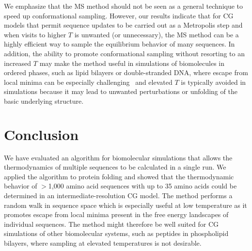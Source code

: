 \documentclass[
aip,
rsi,%
amsmath,amssymb,
reprint,%
]{revtex4-1}
\begin{document}
We emphasize that the MS method should not be seen as a general technique to speed up conformational sampling. However, our results indicate that for CG models that permit sequence updates to be carried out as a Metropolis step and when visits to higher $T$ is unwanted (or unnecessary), the MS method can be a highly efficient way to sample the equilibrium behavior of many sequences. In addition, the ability to promote conformational sampling without resorting to an increased $T$ may make the method useful in simulations of biomolecules in ordered phases, such as lipid bilayers or double-stranded DNA, where escape from local minima can be especially challenging~\cite{Bereau2015,Curuksu2009} and elevated $T$ is typically avoided in simulations because it may lead to unwanted perturbations or unfolding of the basic underlying structure.

\section{Conclusion}
\noindent
We have evaluated an algorithm for biomolecular simulations that allows the thermodynamics of multiple  sequences to be calculated in a single run. We applied the algorithm to protein folding and showed that the thermodynamic behavior of $>$1,000 amino acid sequences with up to 35 amino acids could be determined in an intermediate-resolution CG model. The method performs a random walk in sequence space which is especially useful at low temperature as it promotes escape from local minima present in the free energy landscapes of individual sequences. The method might therefore be well suited for CG simulations of other biomolecular systems, such as peptides in phospholipid bilayers, where sampling at elevated temperatures is not desirable. 


\end{document}
